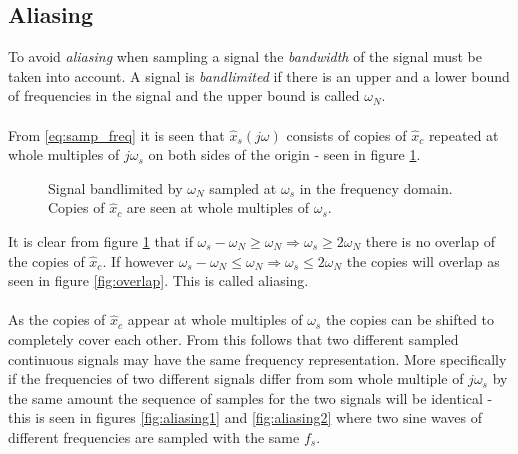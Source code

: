 \subsection{Aliasing}\label{sec:aliasing}
To avoid \textit{aliasing} when sampling a signal the \textit{bandwidth} of the signal must be taken into account. A signal is \textit{bandlimited} if there is an upper and a lower bound of frequencies in the signal and the upper bound is called $\omega_N$. 
\\\\
From \eqref{eq:samp_freq} it is seen that $\hat{x}_s(j\omega)$ consists of copies of $\hat{x}_c$ repeated at whole multiples of $j\omega_s$ on both sides of the origin - seen in figure \ref{fig:copies}.
\begin{figure}[H]
\centering
{}
\caption{Signal bandlimited by $\omega_N$ sampled at $\omega_s$ in the frequency domain. Copies of $\hat{x}_c$ are seen at whole multiples of $\omega_s$.}
\label{fig:copies}
\end{figure}
It is clear from figure \ref{fig:copies} that if $\omega_s-\omega_N\geq \omega_N\Rightarrow \omega_s\geq 2\omega_N$ there is no overlap of the copies of $\hat{x}_c$. If however $\omega_s-\omega_N\leq \omega_N\Rightarrow \omega_s\leq 2\omega_N$ the copies will overlap as seen in figure \ref{fig:overlap}. This is called aliasing.
\\\\
As the copies of $\hat{x}_c$ appear at whole multiples of $\omega_s$ the copies can be shifted to completely cover each other. From this follows that two different sampled continuous signals may have the same frequency representation. More specifically if the frequencies of two different signals differ from som whole multiple of $j\omega_s$ by the same amount the sequence of samples for the two signals will be identical - this is seen in figures  \ref{fig:aliasing1} and \ref{fig:aliasing2} where two sine waves of different frequencies are sampled with the same $f_s$.
